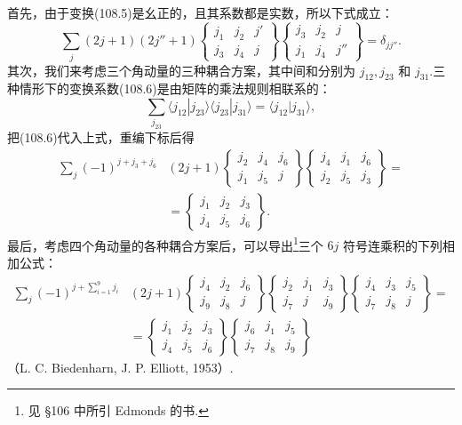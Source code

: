 首先，由于变换(108.5)是幺正的，且其系数都是实数，所以下式成立：
\begin{equation}
  \sum_j(2j+1)(2j''+1)
  \left\{\begin{array}{ccc}j_1&j_2&j'\\j_3&j_4&j\end{array}\right\}
  \left\{\begin{array}{ccc}j_3&j_2&j\\j_1&j_4&j''\end{array}\right\}
  =\delta_{jj''}.
\end{equation}
其次，我们来考虑三个角动量的三种耦合方案，其中间和分别为 $j_{12},j_{23}$ 和 $j_{31}$.三种情形下的变换系数(108.6)是由矩阵的乘法规则相联系的：
\begin{equation*}
  \sum_{j_{23}}\langle j_{12}|j_{23}\rangle
  \langle j_{23}|j_{31}\rangle=\langle j_{12}|j_{31}\rangle,
\end{equation*}
把(108.6)代入上式，重编下标后得
\begin{equation}
\begin{aligned}
  \sum_j(-1)^{j+j_3+j_6}&(2j+1)
  \left\{\begin{array}{ccc}j_2&j_4&j_6\\j_1&j_5&j\end{array}\right\}
  \left\{\begin{array}{ccc}j_4&j_1&j_6\\j_2&j_5&j_3\end{array}\right\}=\\
  &=\left\{\begin{array}{ccc}j_1&j_2&j_3\\j_4&j_5&j_6\end{array}\right\}.
\end{aligned}
\end{equation}
最后，考虑四个角动量的各种耦合方案后，可以导出\footnote{见 §106 中所引 Edmonds 的书.}三个 $6j$ 符号连乘积的下列相加公式：
\begin{equation}
\begin{aligned}
  \sum_j(-1)^{j+\sum_{i=1}^{9}j_i}&(2j+1)
  \left\{\begin{array}{ccc}j_4&j_2&j_6\\j_9&j_8&j\end{array}\right\}
  \left\{\begin{array}{ccc}j_2&j_1&j_3\\j_7&j&j_9\end{array}\right\}
  \left\{\begin{array}{ccc}j_4&j_3&j_5\\j_7&j_8&j\end{array}\right\}=\\
  &=\left\{\begin{array}{ccc}j_1&j_2&j_3\\j_4&j_5&j_6\end{array}\right\}
  \left\{\begin{array}{ccc}j_6&j_1&j_5\\j_7&j_8&j_9\end{array}\right\}
\end{aligned}
\end{equation}
（L. C. Biedenharn, J. P. Elliott, 1953）.

